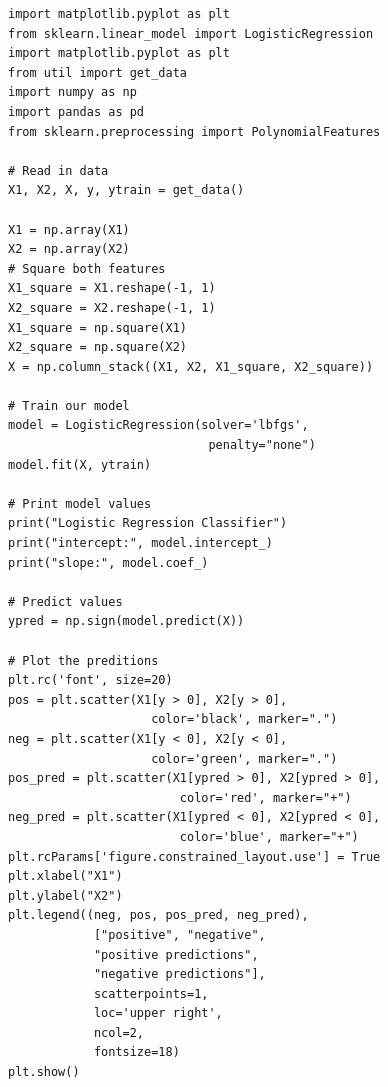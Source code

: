 \documentclass[10pt]{article}
\begin{document}
\begin{lstlisting}
import matplotlib.pyplot as plt
from sklearn.linear_model import LogisticRegression
import matplotlib.pyplot as plt
from util import get_data
import numpy as np
import pandas as pd
from sklearn.preprocessing import PolynomialFeatures

# Read in data
X1, X2, X, y, ytrain = get_data()

X1 = np.array(X1)
X2 = np.array(X2)
# Square both features
X1_square = X1.reshape(-1, 1)
X2_square = X2.reshape(-1, 1)
X1_square = np.square(X1)
X2_square = np.square(X2)
X = np.column_stack((X1, X2, X1_square, X2_square))

# Train our model
model = LogisticRegression(solver='lbfgs',
                            penalty="none")
model.fit(X, ytrain)

# Print model values
print("Logistic Regression Classifier")
print("intercept:", model.intercept_)
print("slope:", model.coef_)

# Predict values
ypred = np.sign(model.predict(X))

# Plot the preditions
plt.rc('font', size=20)
pos = plt.scatter(X1[y > 0], X2[y > 0],
                    color='black', marker=".")
neg = plt.scatter(X1[y < 0], X2[y < 0],
                    color='green', marker=".")
pos_pred = plt.scatter(X1[ypred > 0], X2[ypred > 0],
                        color='red', marker="+")
neg_pred = plt.scatter(X1[ypred < 0], X2[ypred < 0],
                        color='blue', marker="+")
plt.rcParams['figure.constrained_layout.use'] = True
plt.xlabel("X1")
plt.ylabel("X2")
plt.legend((neg, pos, pos_pred, neg_pred), 
            ["positive", "negative", 
            "positive predictions",
            "negative predictions"],
            scatterpoints=1,
            loc='upper right',
            ncol=2,
            fontsize=18)
plt.show() 
\end{lstlisting}
\end{document}
